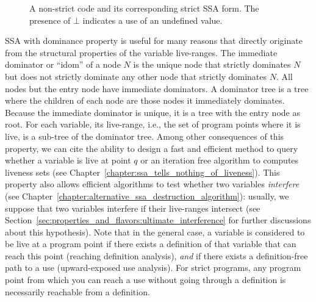\begin{figure}
\caption{A non-strict code and its corresponding strict SSA form. The presence of $\bot$ indicates a use of an undefined value.}
\end{figure}


SSA with dominance property is useful for many reasons that directly originate from the structural properties of the variable live-ranges. 
The immediate dominator or ``idom'' of a node $N$ is the unique node that strictly dominates $N$ but does not strictly dominate any other node that strictly dominates $N$. 
All nodes but the entry node have immediate dominators. 
A dominator tree is a tree where the children of each node are those nodes it immediately dominates. 
Because the immediate dominator is unique, it is a tree with the entry node as root. 
For each variable, its live-range, i.e., the set of program points where it is live, is a sub-tree of the dominator tree. 
Among other consequences of this property, we can cite the ability to design a fast and efficient method to query whether a variable is live at point $q$ or an iteration free algorithm to computes liveness sets (see Chapter~\ref{chapter:ssa_tells_nothing_of_liveness}). 
This property also allows efficient algorithms to test whether two variables \emph{interfere} (see Chapter~\ref{chapter:alternative_ssa_destruction_algorithm}):  usually, we suppose that two variables interfere if their live-ranges intersect (see Section~\ref{sec:properties_and_flavors:ultimate_interference} for further discussions about this hypothesis). 
Note that in the general case, a variable is considered to be live at a program point if there exists a definition of that variable that can reach this point (reaching definition analysis), \emph{and} if there exists a definition-free path to a use (upward-exposed use analysis). 
For strict programs, any program point from which you can reach a use without going through a definition is necessarily reachable from a definition.

